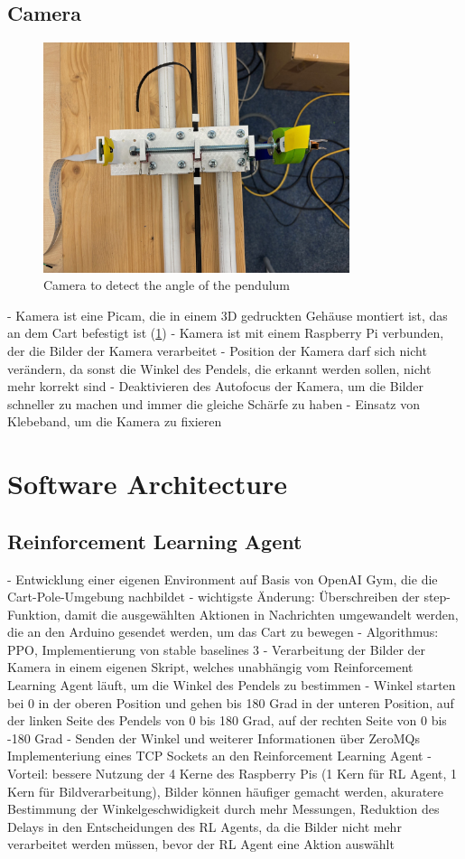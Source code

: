 \subsection{Camera}
\begin{figure}[htbp]
    \centering
    \includegraphics[width=0.8\textwidth]{img/camera.jpg}
    \caption{Camera to detect the angle of the pendulum}
    \label{fig:camera}
\end{figure}
- Kamera ist eine Picam, die in einem 3D gedruckten Gehäuse montiert ist, das an dem Cart befestigt ist (\ref{fig:camera})
- Kamera ist mit einem Raspberry Pi verbunden, der die Bilder der Kamera verarbeitet
- Position der Kamera darf sich nicht verändern, da sonst die Winkel des Pendels, die erkannt werden sollen, nicht mehr korrekt sind
- Deaktivieren des Autofocus der Kamera, um die Bilder schneller zu machen und immer die gleiche Schärfe zu haben
- Einsatz von Klebeband, um die Kamera zu fixieren

\section{Software Architecture}
\subsection{Reinforcement Learning Agent}
- Entwicklung einer eigenen Environment auf Basis von OpenAI Gym, die die Cart-Pole-Umgebung nachbildet
- wichtigste Änderung: Überschreiben der step-Funktion, damit die ausgewählten Aktionen in Nachrichten umgewandelt werden, die an den Arduino gesendet werden, um das Cart zu bewegen
- Algorithmus: PPO, Implementierung von stable baselines 3
- Verarbeitung der Bilder der Kamera in einem eigenen Skript, welches unabhängig vom Reinforcement Learning Agent läuft, um die Winkel des Pendels zu bestimmen
- Winkel starten bei 0 in der oberen Position und gehen bis 180 Grad in der unteren Position, auf der linken Seite des Pendels von 0 bis 180 Grad, auf der rechten Seite von 0 bis -180 Grad
- Senden der Winkel und weiterer Informationen über ZeroMQs Implementeriung eines TCP Sockets an den Reinforcement Learning Agent
- Vorteil: bessere Nutzung der 4 Kerne des Raspberry Pis (1 Kern für RL Agent, 1 Kern für Bildverarbeitung), Bilder können häufiger gemacht werden, akuratere Bestimmung der Winkelgeschwidigkeit durch mehr Messungen, Reduktion des Delays in den Entscheidungen des RL Agents, da die Bilder nicht mehr verarbeitet werden müssen, bevor der RL Agent eine Aktion auswählt


